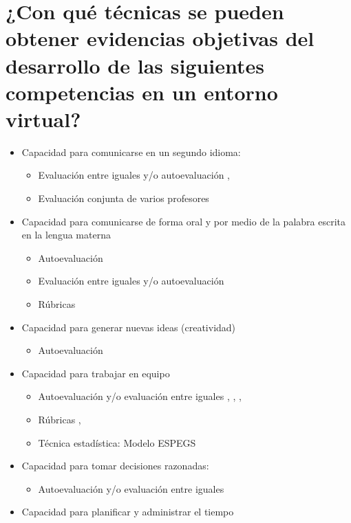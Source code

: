 
\section{¿Con qué técnicas se pueden obtener evidencias objetivas del desarrollo de las siguientes competencias en un entorno virtual?}
\begin{itemize}
\item Capacidad para comunicarse en un segundo idioma:
	\begin{itemize} 
	\item Evaluación entre iguales y/o autoevaluación \cite{Shih:2011}, \cite{Masip-Alvarez:2013}
	\item Evaluación conjunta de varios profesores \cite{MercedesRico:2013}
	\end{itemize}
\item Capacidad para comunicarse de forma oral y por medio de la palabra escrita en la lengua materna
	\begin{itemize} 
	\item Autoevaluación \cite{Liao:2013}
	\item Evaluación entre iguales y/o autoevaluación \cite{Masip-Alvarez:2013}
	\item Rúbricas \cite{Mohamed:2008}
	\end{itemize}
\item Capacidad para generar nuevas ideas (creatividad)
	\begin{itemize} 
	\item Autoevaluación \cite{Liao:2013}
	\end{itemize}
\item Capacidad para trabajar en equipo
	\begin{itemize} 
	\item Autoevaluación y/o evaluación entre iguales \cite{McMahon:2007}, \cite{Lim:2011}, \cite{Masip-Alvarez:2013}, \cite{Liao:2013}
	\item Rúbricas \cite{Mohamed:2008}, \cite{Piedra:2010}
	\item Técnica estadística: Modelo ESPEGS \cite{Rashid:2008}
	\end{itemize}
\item Capacidad para tomar decisiones razonadas:
	\begin{itemize} 
	\item Autoevaluación y/o evaluación entre iguales \cite{Achcaoucaou:2012}
	\end{itemize}
\item Capacidad para planificar y administrar el tiempo

\end{itemize}
